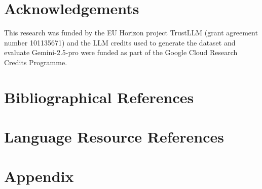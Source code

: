 \documentclass[10pt, a4paper]{article}
\begin{document}
\section*{Acknowledgements}
\label{sec:acknowledgements}

This research was funded by the EU Horizon project TrustLLM (grant agreement number 101135671) and the LLM credits used to generate the dataset and evaluate Gemini-2.5-pro were funded as part of the Google Cloud Research Credits Programme.


\newpage
\nocite{*}
\section{Bibliographical References}\label{sec:reference}




\section{Language Resource References}
\label{lr:ref}

\newpage
\onecolumn
\appendix

\section{Appendix}
\end{document}
